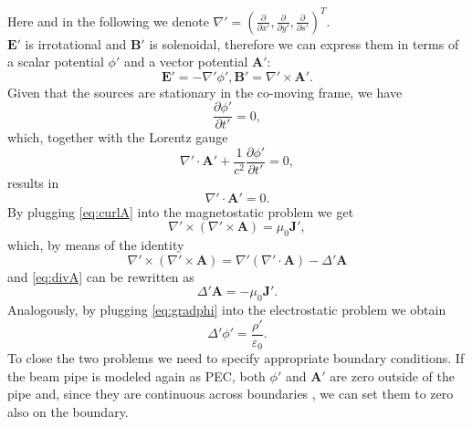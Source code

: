 Here and in the following we denote $\nabla'=(\frac{\partial}{\partial x'}, \frac{\partial}{\partial y'}, \frac{\partial}{\partial s'})^T$.\\
$\mathbf{E}'$ is irrotational and $\mathbf{B}'$ is solenoidal, therefore we can express them in terms of a scalar potential $\phi'$ and a vector potential $\mathbf{A}'$:
\begin{subequations}
    \begin{equation}
        \mathbf{E}'= -\nabla'\phi',
        \label{eq:gradphi}
    \end{equation}
    \begin{equation}
        \mathbf{B}'= \nabla' \times \mathbf{A}'.
        \label{eq:curlA}
    \end{equation}
\end{subequations}
Given that the sources are stationary in the co-moving frame, we have $$\frac{\partial \phi'}{\partial t'}=0,$$ which, together with the Lorentz gauge
\begin{equation*}
    \nabla'\cdot \mathbf{A}' + \frac{1}{c^2}\frac{\partial \phi'}{\partial t'}=0,
\end{equation*}
results in
\begin{equation}
    \nabla'\cdot\mathbf{A}' = 0.
    \label{eq:divA}
\end{equation}
By plugging \ref{eq:curlA} into the magnetostatic problem we get
\begin{equation*}
    \nabla'\times\left( \nabla'\times\mathbf{A} \right) = \mu_0 \mathbf{J}',
\end{equation*}
which, by means of the identity 
\begin{equation*}
    \nabla'\times\left( \nabla'\times\mathbf{A} \right) = \nabla'\left(\nabla'\cdot \mathbf{A}\right) - \Delta'\mathbf{A}
\end{equation*}
and \ref{eq:divA} can be rewritten as
\begin{equation}
    \Delta'\mathbf{A} = -\mu_0\mathbf{J}'.
    \label{eq:poissonAp}
\end{equation}
Analogously, by plugging \ref{eq:gradphi} into the electrostatic problem we obtain
\begin{equation}
    \Delta'\phi' = \frac{\rho'}{\varepsilon_0}.
    \label{eq:poissonphi1}
\end{equation}
To close the two problems we need to specify appropriate boundary conditions. If the beam pipe is modeled again as PEC, both $\phi'$ and $\mathbf{A}'$ are zero outside of the pipe and, since they are continuous across boundaries \cite{Griffiths:1492149}, we can set them to zero also on the boundary.\\
